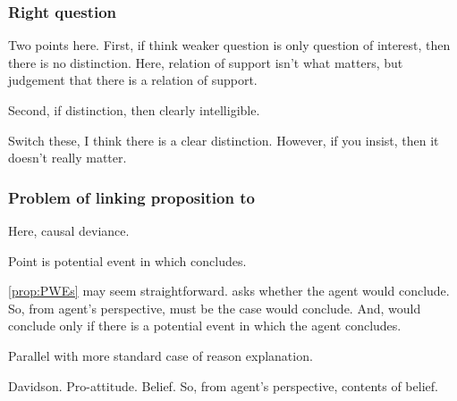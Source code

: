 \subsubsection{Right question}
\label{sec:right-question}

\begin{note}
  Two points here.
  First, if think weaker question is only question of interest, then there is no distinction.
  Here, relation of support isn't what matters, but judgement that there is a relation of support.

  Second, if distinction, then clearly intelligible.

  Switch these, I think there is a clear distinction.
  However, if you insist, then it doesn't really matter.
\end{note}

\begin{note}
  
\end{note}

\subsubsection{Problem of linking proposition to \qWhy{}}
\label{sec:probl-link-prop}

\begin{note}
  Here, causal deviance.
\end{note}

\newpage

\begin{note}
  Point is potential event in which concludes.

  \autoref{prop:PWEs} may seem straightforward.
  \qzS{} asks whether the agent would conclude.
  So, from agent's perspective, must be the case would conclude.
  And, would conclude only if there is a potential event in which the agent concludes.

  Parallel with more standard case of reason explanation.

  Davidson.
  Pro-attitude.
  Belief.
  So, from agent's perspective, contents of belief.
\end{note}

